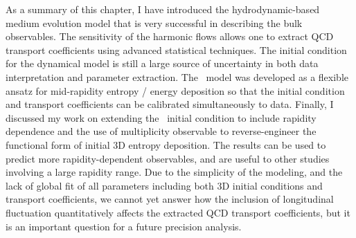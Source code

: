 As a summary of this chapter, I have introduced the hydrodynamic-based  medium evolution model that is very successful in describing the bulk observables.
The sensitivity of the harmonic flows allows one to extract QCD transport coefficients using advanced statistical techniques.
The initial condition for the dynamical model is still a large source of uncertainty in both data interpretation and parameter extraction.
The \trento\ model was developed as a flexible ansatz for mid-rapidity entropy / energy deposition so that the initial condition and transport coefficients can be calibrated simultaneously to data.
Finally, I discussed my work on extending the \trento\ initial condition to include rapidity dependence and the use of multiplicity observable to reverse-engineer the functional form of initial 3D entropy deposition.
The results can be used to predict more rapidity-dependent observables, and are useful to other studies involving a large rapidity range.
Due to the simplicity of the modeling, and the lack of global fit of all parameters including both 3D initial conditions and transport coefficients, we cannot yet answer how the inclusion of longitudinal fluctuation quantitatively affects the extracted QCD transport coefficients, but it is an important question for a future precision analysis.